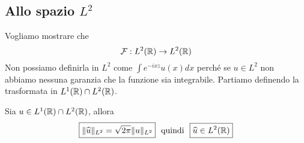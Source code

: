 \subsection{Allo spazio $L^{2}$}

Vogliamo mostrare che
\begin{equation*}
\mathcal{F} : L^{2}(\mathbb{R})\rightarrow L^{2}(\mathbb{R})
\end{equation*}
Non possiamo definirla in $L^{2}$ come $\int e^{- ixz} u(x) dx$ perché se $u\in L^{2}$ non abbiamo nessuna garanzia che la funzione sia integrabile. Partiamo definendo la trasformata in $L^{1}(\mathbb{R}) \cap L^{2}(\mathbb{R})$.
\begin{thm}
[di Plancherel]
Sia $u\in L^{1}(\mathbb{R}) \cap L^{2}(\mathbb{R})$, allora
\begin{equation*}
\boxed{\Vert \hat{u} \Vert_{L^{2}} = \sqrt{2\pi} \Vert u \Vert_{L^{2}}} \ \ \text{quindi} \ \ \boxed{\hat{u} \in L^{2}(\RR)}
\end{equation*}
\end{thm}

